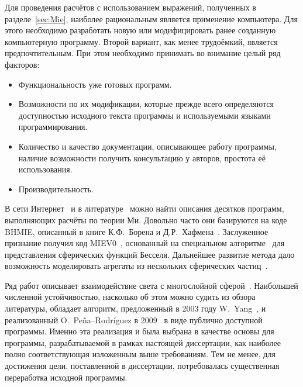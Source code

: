 
Для проведения расчётов с использованием выражений, полученных в
разделе~\ref{sec:Mie}, наиболее рациональным является применение
компьютера.  Для этого необходимо разработать новую или модифицировать
ранее созданную компьютерную программу. Второй вариант, как менее
трудоёмкий, является предпочтительным.  При этом необходимо принимать
во внимание целый ряд факторов:
\begin{itemize}
\item Функциональность уже готовых программ.
\item Возможности по их модификации, которые прежде всего определяются
  доступностью исходного текста программы и используемыми языками
  программирования.
\item Количество и качество документации, описывающее работу
  программы, наличие возможности получить консультацию у авторов,
  простота её использования.
\item Производительность.
\end{itemize}

В сети Интернет~\cite{scattport,wiki-mie-codes} и в
литературе~\cite{Wriedt-2009} можно найти описания десятков программ,
выполняющих расчёты по теории Ми.  Довольно часто они базируются на
коде BHMIE, описанный в книге К.Ф.~Борена и
Д.Р.~Хафмена~\cite{Bohren-1983}.  Заслуженное признание получил код
MIEV0~\cite{Wiscombe-1980}, основанный на специальном
алгоритме~\cite{Lentz-76} для представления сферических функций
Бесселя. Дальнейшее развитие метода дало возможность моделировать
агрегаты из нескольких сферических частиц~\cite{Mackowski-96,Xu-95}.

Ряд работ описывает взаимодействие света с многослойной
сферой~\cite{Kai-94,Wu-97, Bhandari-85}.  Наибольшей численной
устойчивостью, насколько об этом можно судить из обзора литературы,
обладает алгоритм, предложенный в 2003 году W.~Yang~\cite{Yang-2003},
и реализованный O.~Pe\~{n}a--Rodr\'{i}guez в
2009~\cite{Pena-scattnlay-2009} в виде публично доступной программы.
Именно эта реализация и была выбрана в качестве основы для программы,
разрабатываемой в рамках настоящей диссертации, как наиболее полно
соответствующая изложенным выше требованиям.  Тем не менее, для достижения
цели, поставленной в диссертации, потребовалась существенная
переработка исходной программы.


